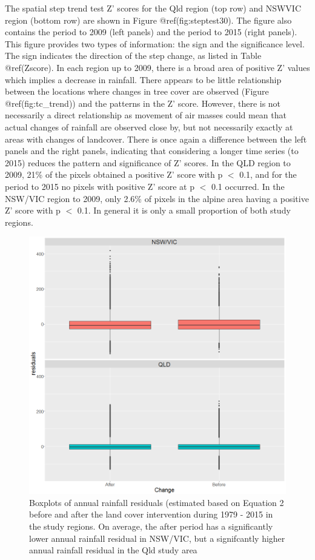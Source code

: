 \documentclass[fleqn,10pt,lineno]{wlpeerj} %
\begin{document}
The spatial step trend test Z' scores for the Qld region (top row) and
NSWVIC region (bottom row) are shown in Figure @ref(fig:steptest30). The
figure also contains the period to 2009 (left panels) and the period to
2015 (right panels). This figure provides two types of information: the
sign and the significance level. The sign indicates the direction of the
step change, as listed in Table @ref(Zscore). In each region up to 2009,
there is a broad area of positive Z' values which implies a decrease in
rainfall. There appears to be little relationship between the locations
where changes in tree cover are observed (Figure @ref(fig:tc\_trend))
and the patterns in the Z' score. However, there is not necessarily a
direct relationship as movement of air masses could mean that actual
changes of rainfall are observed close by, but not necessarily exactly
at areas with changes of landcover. There is once again a difference
between the left panels and the right panels, indicating that
considering a longer time series (to 2015) reduces the pattern and
significance of Z' scores. In the QLD region to 2009, 21\% of the pixels
obtained a positive Z' score with p \(<\) 0.1, and for the period to
2015 no pixels with positive Z' score at p \(<\) 0.1 occurred. In the
NSW/VIC region to 2009, only 2.6\% of pixels in the alpine area having a
positive Z' score with p \(<\) 0.1. In general it is only a small
proportion of both study regions.

\begin{figure}
\includegraphics[width=0.9\linewidth]{figures/ResidualBoxplotchange} \caption{Boxplots of annual rainfall residuals (estimated based on Equation 2 before and after the land cover intervention during 1979 - 2015 in the study regions. On average, the after period has a significantly lower annual rainfall residual in NSW/VIC, but a signifcantly higher annual rainfall residual in the Qld study area}\label{fig:meandiff}
\end{figure}
\end{document}
